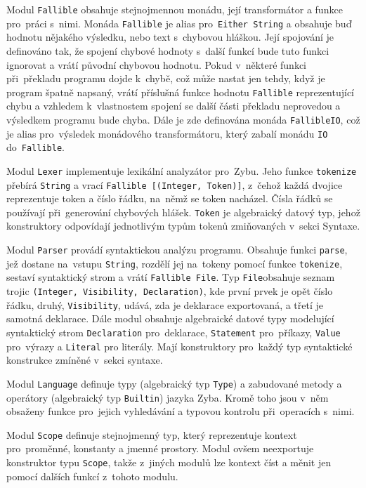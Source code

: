 \documentclass[a4paper,12pt]{article}
\begin{document}
Modul \texttt{Fallible} obsahuje stejnojmennou monádu, její transformátor a funkce pro~práci s~nimi. Monáda \texttt{Fallible} je alias pro~\texttt{Either String} a obsahuje buď hodnotu nějakého výsledku, nebo text s~chybovou hláškou. Její spojování je definováno tak, že spojení chybové hodnoty s~další funkcí bude tuto funkci ignorovat a vrátí původní chybovou hodnotu. Pokud v~některé funkci při~překladu programu dojde k~chybě, což může nastat jen tehdy, když je program špatně napsaný, vrátí příslušná funkce hodnotu \texttt{Fallible} reprezentující chybu a vzhledem k~vlastnostem spojení se další části překladu neprovedou a výsledkem programu bude chyba. Dále je zde definována monáda \texttt{FallibleIO}, což je alias pro~výsledek monádového transformátoru, který zabalí monádu \texttt{IO} do~\texttt{Fallible}.

Modul \texttt{Lexer} implementuje lexikální analyzátor pro~Zybu. Jeho funkce \texttt{tokenize} přebírá \texttt{String} a vrací \texttt{Fallible [(Integer, Token)]}, z~čehož každá dvojice reprezentuje token a číslo řádku, na~němž se token nacházel. Čísla řádků se používají při~generování chybových hlášek. \texttt{Token} je algebraický datový typ, jehož konstruktory odpovídají jednotlivým typům tokenů zmiňovaných v~sekci Syntaxe.

Modul \texttt{Parser} provádí syntaktickou analýzu programu. Obsahuje funkci \texttt{parse}, jež dostane na~vstupu \texttt{String}, rozdělí jej na~tokeny pomocí funkce \texttt{tokenize}, sestaví syntaktický strom a vrátí \texttt{Fallible File}. Typ \texttt{File}obsahuje seznam trojic \texttt{(Integer, Visibility, Declaration)}, kde první prvek je opět číslo řádku, druhý, \texttt{Visibility}, udává, zda je deklarace exportovaná, a třetí je samotná deklarace. Dále modul obsahuje algebraické datové typy modelující syntaktický strom \texttt{Declaration} pro~deklarace, \texttt{Statement} pro~příkazy, \texttt{Value} pro~výrazy a \texttt{Literal} pro literály. Mají konstruktory pro~každý typ syntaktické konstrukce zmíněné v~sekci syntaxe.

Modul \texttt{Language} definuje typy (algebraický typ \texttt{Type}) a zabudované metody a operátory (algebraický typ \texttt{Builtin}) jazyka Zyba. Kromě toho jsou v~něm obsaženy funkce pro~jejich vyhledávání a typovou kontrolu při~operacích s~nimi.

Modul \texttt{Scope} definuje stejnojmenný typ, který reprezentuje kontext pro~proměnné, konstanty a jmenné prostory. Modul ovšem neexportuje konstruktor typu \texttt{Scope}, takže z~jiných modulů lze kontext číst a měnit jen pomocí dalších funkcí z~tohoto modulu.
\end{document}
